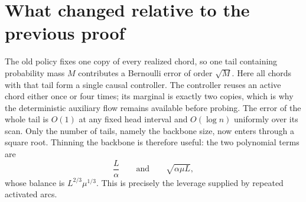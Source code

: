 \documentclass[11pt]{article}
\theoremstyle{remark}
\begin{document}
\section{What changed relative to the previous proof}

The old policy fixes one copy of every realized chord, so one tail containing
probability mass $M$ contributes a Bernoulli error of order $\sqrt M$.
Here all chords with that tail form a single causal controller.  The
controller reuses an active chord either once or four times; its marginal is
exactly two copies, which is why the deterministic auxiliary flow remains
available before probing.  The error of the whole tail is $O(1)$ at any fixed
head interval and $O(\log n)$ uniformly over its scan.  Only the number of
tails, namely the backbone size, now enters through a square root.  Thinning
the backbone is therefore useful: the two polynomial terms are
\[
  \frac L\alpha
  \qquad\text{and}\qquad
  \sqrt{\alpha\mu L},
\]
whose balance is $L^{2/3}\mu^{1/3}$.  This is precisely the leverage supplied
by repeated activated arcs.
\end{document}
